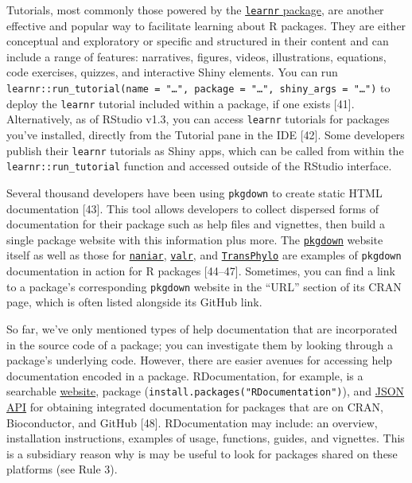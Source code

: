 \documentclass[10pt,letterpaper]{article}
\begin{document}
Tutorials, most commonly those powered by the
\href{https://rstudio.github.io/learnr/}{\texttt{learnr} package}, are
another effective and popular way to facilitate learning about R
packages. They are either conceptual and exploratory or specific and
structured in their content and can include a range of features:
narratives, figures, videos, illustrations, equations, code exercises,
quizzes, and interactive Shiny elements. You can run
\texttt{learnr::run\_tutorial(name\ =\ "\ldots{}",\ package\ =\ "\ldots{}",\ shiny\_args\ =\ "\ldots{}")}
to deploy the \texttt{learnr} tutorial included within a package, if one
exists {[}41{]}. Alternatively, as of RStudio v1.3, you can access
\texttt{learnr} tutorials for packages you've installed, directly from
the Tutorial pane in the IDE {[}42{]}. Some developers publish their
\texttt{learnr} tutorials as Shiny apps, which can be called from within
the \texttt{learnr::run\_tutorial} function and accessed outside of the
RStudio interface.

Several thousand developers have been using \texttt{pkgdown} to create
static HTML documentation {[}43{]}. This tool allows developers to
collect dispersed forms of documentation for their package such as help
files and vignettes, then build a single package website with this
information plus more. The
\href{https://pkgdown.r-lib.org/}{\texttt{pkgdown}} website itself as
well as those for
\href{http://naniar.njtierney.com/index.html}{\texttt{naniar}},
\href{https://rnabioco.github.io/valr/}{\texttt{valr}}, and
\href{https://xavierdidelot.github.io/TransPhylo/articles/TransPhylo.html}{\texttt{TransPhylo}}
are examples of \texttt{pkgdown} documentation in action for R packages
{[}44--47{]}. Sometimes, you can find a link to a package's
corresponding \texttt{pkgdown} website in the ``URL'' section of its
CRAN page, which is often listed alongside its GitHub link.

So far, we've only mentioned types of help documentation that are
incorporated in the source code of a package; you can investigate them
by looking through a package's underlying code. However, there are
easier avenues for accessing help documentation encoded in a package.
RDocumentation, for example, is a searchable
\href{https://www.rdocumentation.org/}{website}, package
(\texttt{install.packages("RDocumentation")}), and
\href{https://www.rdocumentation.org/docs/}{JSON API} for obtaining
integrated documentation for packages that are on CRAN, Bioconductor,
and GitHub {[}48{]}. RDocumentation may include: an overview,
installation instructions, examples of usage, functions, guides, and
vignettes. This is a subsidiary reason why is may be useful to look for
packages shared on these platforms (see Rule 3).
\end{document}
